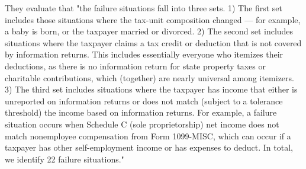 \documentclass[12pt]{article}
\begin{document}
They evaluate that "the failure situations fall into three sets. 1) The first set includes those situations where the tax-unit composition changed — for example, a baby is born, or the taxpayer married or divorced. 2) The second set includes situations where the taxpayer claims a tax credit or deduction that is not covered by information returns. This includes essentially everyone who itemizes their deductions, as there is no information return for state property taxes or charitable contributions, which (together) are nearly universal among itemizers. 3) The third set includes situations where the taxpayer has income that either is unreported on information returns or does not match (subject to a tolerance threshold) the income based on information returns. For example, a failure situation occurs when Schedule C (sole proprietorship) net income does not match nonemployee compensation from Form 1099-MISC, which can occur if a taxpayer has other self-employment income or has expenses to deduct. In total, we identify 22 failure situations."
\end{document}
